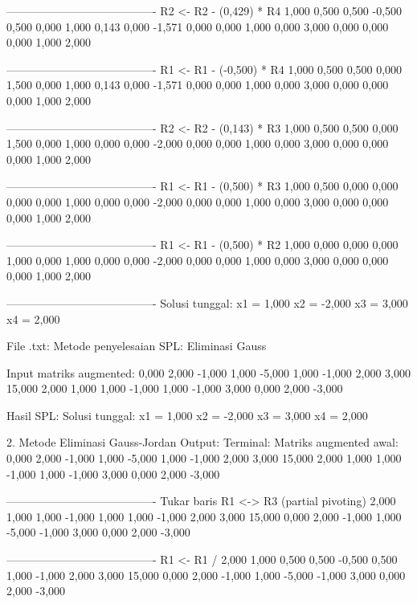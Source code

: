 \documentclass[12pt]{article}
\begin{document}
\begin{enumerate}
\begin{keluaran}
----------------------------------------
R2 <- R2 - (0,429) * R4
1,000   0,500   0,500   -0,500  0,500
0,000   1,000   0,143   0,000   -1,571
0,000   0,000   1,000   0,000   3,000
0,000   0,000   0,000   1,000   2,000

----------------------------------------
R1 <- R1 - (-0,500) * R4
1,000   0,500   0,500   0,000   1,500
0,000   1,000   0,143   0,000   -1,571
0,000   0,000   1,000   0,000   3,000
0,000   0,000   0,000   1,000   2,000

----------------------------------------
R2 <- R2 - (0,143) * R3
1,000   0,500   0,500   0,000   1,500
0,000   1,000   0,000   0,000   -2,000
0,000   0,000   1,000   0,000   3,000
0,000   0,000   0,000   1,000   2,000

----------------------------------------
R1 <- R1 - (0,500) * R3
1,000   0,500   0,000   0,000   0,000
0,000   1,000   0,000   0,000   -2,000
0,000   0,000   1,000   0,000   3,000
0,000   0,000   0,000   1,000   2,000

----------------------------------------
R1 <- R1 - (0,500) * R2
1,000   0,000   0,000   0,000   1,000
0,000   1,000   0,000   0,000   -2,000
0,000   0,000   1,000   0,000   3,000
0,000   0,000   0,000   1,000   2,000

----------------------------------------
Solusi tunggal:
x1 = 1,000
x2 = -2,000
x3 = 3,000
x4 = 2,000

File .txt:
Metode penyelesaian SPL: Eliminasi Gauss

Input matriks augmented:
0,000	2,000	-1,000	1,000	-5,000
1,000	-1,000	2,000	3,000	15,000
2,000	1,000	1,000	-1,000	1,000
-1,000	3,000	0,000	2,000	-3,000

Hasil SPL:
Solusi tunggal:
x1 = 1,000
x2 = -2,000
x3 = 3,000
x4 = 2,000

2. Metode Eliminasi Gauss-Jordan
Output:
Terminal:
Matriks augmented awal:
0,000   2,000   -1,000  1,000   -5,000
1,000   -1,000  2,000   3,000   15,000
2,000   1,000   1,000   -1,000  1,000
-1,000  3,000   0,000   2,000   -3,000

----------------------------------------
Tukar baris R1 <-> R3 (partial pivoting)
2,000   1,000   1,000   -1,000  1,000
1,000   -1,000  2,000   3,000   15,000
0,000   2,000   -1,000  1,000   -5,000
-1,000  3,000   0,000   2,000   -3,000

----------------------------------------
R1 <- R1 / 2,000
1,000   0,500   0,500   -0,500  0,500
1,000   -1,000  2,000   3,000   15,000
0,000   2,000   -1,000  1,000   -5,000
-1,000  3,000   0,000   2,000   -3,000


\end{keluaran}
\end{enumerate}
\end{document}
